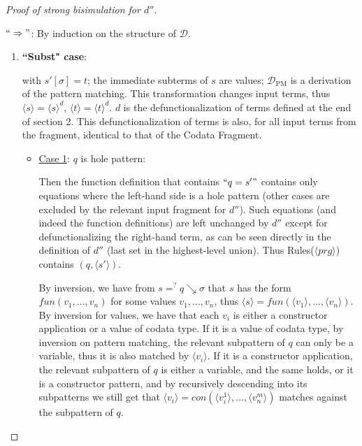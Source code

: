 \documentclass[11pt]{article} %
\begin{document}
\begin{proof}[Proof of strong bisimulation for $d''$] ~

$`` \Rightarrow "$: By induction on the structure of $\mathcal{D}$.

\begin{enumerate}
\item \textbf{``Subst" case}:

\begin{prooftree}
\end{prooftree}

with $s'[\sigma] = t$; the immediate subterms of $s$ are values; $\mathcal{D}_{\textrm{PM}}$ is a derivation of the pattern matching. This transformation changes input terms, thus $\langle s \rangle = \langle s \rangle^d$, $\langle t \rangle = \langle t \rangle^d$. $d$ is the defunctionalization of terms defined at the end of section 2. This defunctionalization of terms is also, for all input terms from the fragment, identical to that of the Codata Fragment.

\begin{itemize}

\item \underline{Case 1}: $q$ is hole pattern:

Then the function definition that contains $`` q = s' "$ contains only equations where the left-hand side is a hole pattern (other cases are excluded by the relevant input fragment for $d''$). Such equations (and indeed the function definitions) are left unchanged by $d''$ except for defunctionalizing the right-hand term, as can be seen directly in the definition of $d''$ (last set in the highest-level union). Thus Rules($\langle prg \rangle$) contains $(q, \langle s' \rangle)$.

By inversion, we have from $s =^? q \searrow \sigma$ that $s$ has the form $fun(v_1, ..., v_n)$ for some values $v_1, ..., v_n$, thus $\langle s \rangle = fun(\langle v_1 \rangle, ..., \langle v_n \rangle)$. By inversion for values, we have that each $v_i$ is either a constructor application or a value of codata type. If it is a value of codata type, by inversion on pattern matching, the relevant subpattern of $q$ can only be a variable, thus it is also matched by $\langle v_i \rangle$. If it is a constructor application, the relevant subpattern of $q$ is either a variable, and the same holds, or it is a constructor pattern, and by recursively descending into its subpatterns we still get that $\langle v_i \rangle = con(\langle v^1_i \rangle, ..., \langle v^m_n \rangle)$ matches against the subpattern of $q$.


\end{itemize}
\end{enumerate}
\end{proof}
\end{document}
